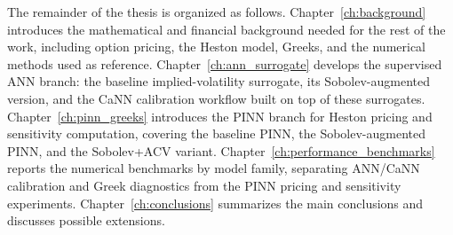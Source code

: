 The remainder of the thesis is organized as follows. 
Chapter~\ref{ch:background} introduces the mathematical and financial background needed for the rest of the work, including option pricing, the Heston model, Greeks, and the numerical methods used as reference.
Chapter~\ref{ch:ann_surrogate} develops the supervised ANN branch: the baseline implied-volatility surrogate, its Sobolev-augmented version, and the CaNN calibration workflow built on top of these surrogates.
Chapter~\ref{ch:pinn_greeks} introduces the PINN branch for Heston pricing and sensitivity computation, covering the baseline PINN, the Sobolev-augmented PINN, and the Sobolev+ACV variant.
Chapter~\ref{ch:performance_benchmarks} reports the numerical benchmarks by model family, separating ANN/CaNN calibration and Greek diagnostics from the PINN pricing and sensitivity experiments.
Chapter~\ref{ch:conclusions} summarizes the main conclusions and discusses possible extensions.
